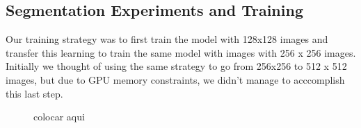 \documentclass[conference]{IEEEtran}
\begin{document}
\subsection{Segmentation Experiments and Training}
\label{sec:seg_training}
Our training strategy was to first train the model with 128x128 images and transfer this learning to train the same model with images with 256 x 256 images. Initially we thought of using the same strategy to go from 256x256 to 512 x 512 images, but due to GPU memory constraints, we didn't manage to acccomplish this last step.

\begin{figure}
\centering
{}
\hfil
{}
\caption{colocar aqui}\label{lr_find_chart}
\end{figure}
\end{document}
